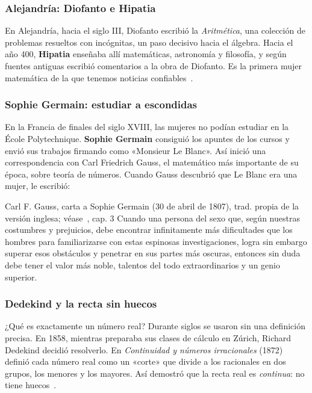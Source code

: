 \documentclass[11pt]{article}
\begin{document}
\subsubsection*{Alejandría: Diofanto e Hipatia}

En Alejandría, hacia el siglo III, Diofanto escribió la \emph{Aritmética}, una
colección de problemas resueltos con incógnitas, un paso decisivo hacia el
álgebra. Hacia el año 400, \textbf{Hipatia} enseñaba allí matemáticas, astronomía
y filosofía, y según fuentes antiguas escribió comentarios a la obra de Diofanto.
Es la primera mujer matemática de la que tenemos noticias confiables~\cite{dzielska}.

\subsubsection*{Sophie Germain: estudiar a escondidas}

En la Francia de finales del siglo XVIII, las mujeres no podían estudiar en la
École Polytechnique. \textbf{Sophie Germain} consiguió los apuntes de los cursos y
envió sus trabajos firmando como «Monsieur Le Blanc». Así inició una
correspondencia con Carl Friedrich Gauss, el matemático más importante de su
época, sobre teoría de números. Cuando Gauss descubrió que Le Blanc era una mujer,
le escribió:

\begin{cita}{Carl F. Gauss, carta a Sophie Germain (30 de abril de 1807), trad. propia de la versión inglesa; véase~\cite{bucciarelli}, cap. 3}
Cuando una persona del sexo que, según nuestras costumbres y prejuicios, debe
encontrar infinitamente más dificultades que los hombres para familiarizarse con
estas espinosas investigaciones, logra sin embargo superar esos obstáculos y
penetrar en sus partes más oscuras, entonces sin duda debe tener el valor más
noble, talentos del todo extraordinarios y un genio superior.
\end{cita}

\subsubsection*{Dedekind y la recta sin huecos}

¿Qué es exactamente un número real? Durante siglos se usaron sin una definición
precisa. En 1858, mientras preparaba sus clases de cálculo en Zúrich, Richard
Dedekind decidió resolverlo. En \emph{Continuidad y números irracionales} (1872)
definió cada número real como un «corte» que divide a los racionales en dos
grupos, los menores y los mayores. Así demostró que la recta real es
\emph{continua}: no tiene huecos~\cite{dedekind}.
\end{document}
